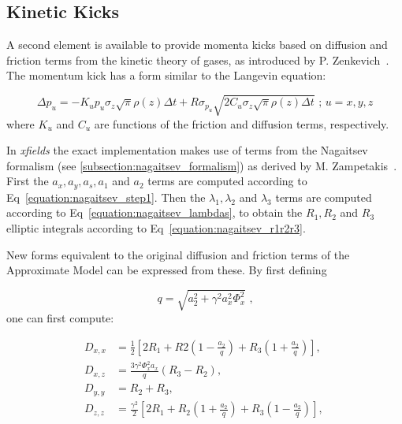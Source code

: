 \subsection{Kinetic Kicks}
\label{subsection:kinetic_kicks}

A second element is available to provide momenta kicks based on diffusion and friction terms from the kinetic theory of gases, as introduced by P. Zenkevich~\cite{NuclInstr:Zenkevich:IBSKineticKick}.
The momentum kick has a form similar to the Langevin equation:

\begin{equation}
    \Delta p_u = - K_u p_u \sigma_z \sqrt{\pi} \rho(z) \Delta t + R \sigma_{p_u} \sqrt{2 C_u \sigma_z \sqrt{\pi} \rho(z) \Delta t} \text{ ;   } u=x,y,z
    \label{equation:original_kinetic_kick}
\end{equation}
where \(K_u\) and \(C_u\) are functions of the friction and diffusion terms, respectively.
\newline

In \textit{xfields} the exact implementation makes use of terms from the Nagaitsev formalism (see \ref{subsection:nagaitsev_formalism}) as derived by M. Zampetakis~\cite{arXiv:Zampetakis:Interplay_SC_IBS_LHC_Chain}.
First the \(a_x, a_y, a_s, a_1\) and \(a_2\) terms are computed according to Eq~\eqref{equation:nagaitsev_step1}.
Then the \(\lambda_1, \lambda_2\) and \(\lambda_3\) terms are computed according to Eq~\eqref{equation:nagaitsev_lambdas}, to obtain the \(R_1, R_2\) and \(R_3\) elliptic integrals according to Eq~\eqref{equation:nagaitsev_r1r2r3}.
\newline

New forms equivalent to the original diffusion and friction terms of the Approximate Model can be expressed from these.
By first defining

\begin{equation}
    q = \sqrt{a_2^{2} + \gamma^2 a_x^{2} \Phi_x^2} \text{ ,}
\end{equation}
one can first compute:

\begin{equation}
    \begin{aligned}
        D_{x,x} &= \frac{1}{2} \left[ 2 R_1 + R2 \left(1 - \frac{a_2}{q}\right) + R_3 \left(1 + \frac{a_2}{q}\right) \right] \text{,  } \\
        D_{x,z} &= \frac{3 \gamma^2 \Phi_x^2 a_x}{q} \left(R_3 - R_2\right) \text{,  }  \\
        D_{y,y} &= R_2 + R_3 \text{,  }  \\
        D_{z,z} &= \frac{\gamma^2}{2} \left[ 2 R_1 +  R_2 \left(1 + \frac{a_2}{q}\right) + R_3 \left(1 - \frac{a_2}{q}\right) \right] \text{, }
    \end{aligned}
    \label{equation:kinetic_AM_diffusion_terms}
\end{equation}

